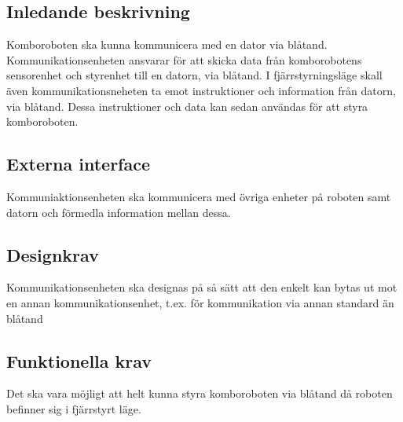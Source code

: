 \documentclass[a4paper,12pt]{article}
\begin{document}
\subsection{Inledande beskrivning}
Komboroboten ska kunna kommunicera med en dator via blåtand.
Kommunikationsenheten ansvarar för att skicka data från komborobotens 
sensorenhet och styrenhet till en datorn, via blåtand.
I fjärrstyrningsläge skall även kommunikationsneheten ta emot 
instruktioner och information från datorn, via blåtand.
Dessa instruktioner och data kan sedan användas för att styra komboroboten.


\begin{LIPSkravlista}
\end{LIPSkravlista}

\subsection{Externa interface}
Kommuniaktionsenheten ska kommunicera med övriga enheter på roboten samt datorn och förmedla information mellan dessa.


\begin{LIPSkravlista}
\end{LIPSkravlista}

\subsection{Designkrav}
Kommunikationsenheten ska designas på så sätt att den enkelt kan bytas ut mot en annan kommunikationsenhet,
t.ex. för kommunikation via annan standard än blåtand


\begin{LIPSkravlista}
\end{LIPSkravlista}

\subsection{Funktionella krav}
Det ska vara möjligt att helt kunna styra komboroboten via blåtand då roboten befinner sig i fjärrstyrt läge.
\end{document}
